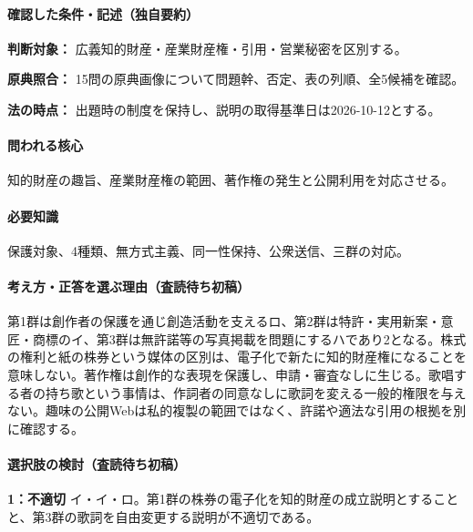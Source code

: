 \paragraph{確認した条件・記述（独自要約）}\mbox{}\par

\noindent\textbf{判断対象：} 広義知的財産・産業財産権・引用・営業秘密を区別する。\par

\noindent\textbf{原典照合：} 15問の原典画像について問題幹、否定、表の列順、全5候補を確認。\par

\noindent\textbf{法の時点：} 出題時の制度を保持し、説明の取得基準日は2026-10-12とする。\par

\paragraph{問われる核心} 知的財産の趣旨、産業財産権の範囲、著作権の発生と公開利用を対応させる。

\paragraph{必要知識} 保護対象、4種類、無方式主義、同一性保持、公衆送信、三群の対応。

\paragraph{考え方・正答を選ぶ理由（査読待ち初稿）} 第1群は創作者の保護を通じ創造活動を支えるロ、第2群は特許・実用新案・意匠・商標のイ、第3群は無許諾等の写真掲載を問題にするハであり2となる。株式の権利と紙の株券という媒体の区別は、電子化で新たに知的財産権になることを意味しない。著作権は創作的な表現を保護し、申請・審査なしに生じる。歌唱する者の持ち歌という事情は、作詞者の同意なしに歌詞を変える一般的権限を与えない。趣味の公開Webは私的複製の範囲ではなく、許諾や適法な引用の根拠を別に確認する。

\paragraph{選択肢の検討（査読待ち初稿）}\mbox{}\par

\noindent\textbf{1：不適切} イ・イ・ロ。第1群の株券の電子化を知的財産の成立説明とすることと、第3群の歌詞を自由変更する説明が不適切である。\par

